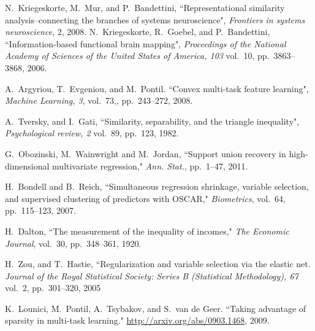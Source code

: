 \documentclass{article}
\begin{document}
%
	\begin{thebibliography}{20}
		
		
		 N.~Kriegeskorte, M.~Mur, and P.~Bandettini, ``Representational similarity analysis--connecting the branches of systems neuroscience", \emph{Frontiers in systems neuroscience}, 2, 2008.
			 N.~Kriegeskorte, R.~Goebel, and P.~Bandettini,  ``Information-based functional brain mapping", \emph{Proceedings of the National Academy of Sciences of the United States of America, 103} vol.~10, pp.~3863--3868, 2006.
		
	
		 A.~Argyriou, T.~Evgeniou, and M.~Pontil. ``Convex multi-task feature learning",  \emph{Machine Learning, 3},
vol.~73,, pp.~243--272, 2008.
		
		A.~Tversky, and I.~Gati, ``Similarity, separability, and the triangle inequality", \emph{Psychological review, 2} vol.~89, pp.~123, 1982.
		
		G.~Obozinski, M.~Wainwright and M.~Jordan, ``Support union recovery in high-dimensional multivariate regression," {\it Ann. Stat.}, pp.~1--47, 2011.
		
		H.~Bondell and B.~Reich, ``Simultaneous regression shrinkage, variable selection, and supervised clustering of predictors with OSCAR," {\it Biometrics}, vol.~64, pp.~115--123, 2007.
		
		
		H.~Dalton, ``The measurement of the inequality of incomes," {\it The Economic Journal}, vol.~30, pp.~348--361, 1920.
		
		
		
		
		H.~Zou, and T.~Hastie, ``Regularization and variable selection via the elastic net. \emph{Journal of the Royal Statistical Society: Series B (Statistical Methodology), 67} vol.~2, pp.~301--320, 2005
		
		 K.~Lounici, M.~Pontil, A.~Tsybakov, and S.~van de Geer. ``Taking advantage of sparsity in multi-task learning." \url{http://arxiv.org/abs/0903.1468}, 2009.
		

\end{thebibliography}
\end{document}
